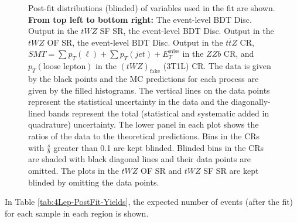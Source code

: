 \begin{figure}[htbp]
        \caption{Post-fit distributions (blinded) of variables used in the fit are shown. \textbf{From top left to bottom right:} The event-level BDT Disc. Output in the $tWZ$ SF SR, the event-level BDT Disc. Output in the $tWZ$ OF SR, the event-level BDT Disc. Output in the $t\bar{t}Z$ CR, $SMT = \sum p_{T} (\ell) + \sum p_{T} (jet) + E_{T}^{\text{miss}}$ in the $ZZb$ CR, and $p_{T}(\text{loose lepton})$ in the $(tWZ)_{\text{fake}}$ (3T1L) CR. The data is given by the black points and the MC predictions for each process are given by the filled histograms. The vertical lines on the data points represent the statistical uncertainty in the data and the diagonally-lined bands represent the total (statistical and systematic added in quadrature) uncertainty. The lower panel in each plot shows the ratios of the data to the theoretical predictions. Bins in the CRs with $\frac{s}{b}$ greater than 0.1 are kept blinded. Blinded bins in the CRs are shaded with black diagonal lines and their data points are omitted. The plots in the $tWZ$ OF SR and $tWZ$ SF SR are kept blinded by omitting the data points. }
  \label{fig:4lep-postfitPlots}
\end{figure}In Table \ref{tab:4Lep-PostFit-Yields}, the expected number of events (after the fit) for each sample in each region is shown.

